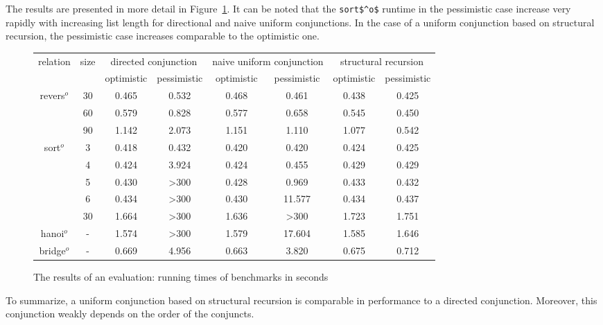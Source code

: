 The results are presented in more detail in Figure~\ref{fair:evaluation-table}. It can be noted that the \lstinline{sort$^o$} runtime in the pessimistic case increase very rapidly with increasing list length for directional and naive uniform conjunctions. In the case of a uniform conjunction based on structural recursion, the pessimistic case increases comparable to the optimistic one.

\begin{figure}[h]
  \small
  \centering
  \begin{tabular}{ c | c | c | c | c | c | c | c }
    \multirow{2}{*}{relation} & \multirow{2}{*}{size} & 
    \multicolumn{2}{c}{directed conjunction} &
    \multicolumn{2}{c}{naive uniform conjunction} &
    \multicolumn{2}{c}{structural recursion} \\
    \cline{3-8}
    & & optimistic & pessimistic & optimistic & pessimistic & optimistic & pessimistic  \\ 
    \hline
    \multirow{3}{*}{revers$^o$}
                 & 30   & 0.465 & 0.532 & 0.468 & 0.461  & 0.438 & 0.425 \\
                 & 60   & 0.579 & 0.828 & 0.577 & 0.658  & 0.545 & 0.450 \\
                 & 90   & 1.142 & 2.073 & 1.151 & 1.110  & 1.077 & 0.542 \\
    \hline
    \multirow{5}{*}{sort$^o$}
                 & 3    & 0.418 & 0.432 & 0.420 & 0.420  & 0.424 & 0.425 \\
                 & 4    & 0.424 & 3.924 & 0.424 & 0.455  & 0.429 & 0.429 \\
                 & 5    & 0.430 & >300  & 0.428 & 0.969  & 0.433 & 0.432 \\
                 & 6    & 0.434 & >300  & 0.430 & 11.577 & 0.434 & 0.437 \\
                 & 30   & 1.664 & >300  & 1.636 & >300   & 1.723 & 1.751 \\ 
    \hline
    hanoi$^o$    & -    & 1.574 & >300  & 1.579 & 17.604 & 1.585 & 1.646 \\
    \hline
    bridge$^o$   & -    & 0.669 & 4.956 & 0.663 & 3.820 & 0.675 & 0.712    

  \end{tabular}
  \caption{The results of an evaluation: running times of benchmarks in seconds}
  \label{fair:evaluation-table}
\end{figure}

To summarize, a uniform conjunction based on structural recursion is comparable in performance to a directed conjunction. Moreover, this conjunction weakly depends on the order of the conjuncts.